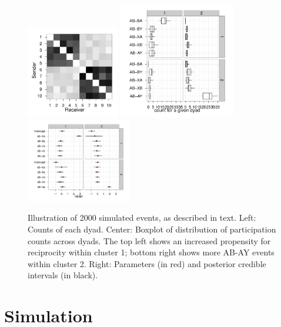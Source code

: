 \documentclass{article}
\begin{document}


\begin{figure}
\center
\includegraphics[width=1.6in]{../figs/synthetic/mat.pdf}
\includegraphics[width=2in]{../figs/synthetic/counts.pdf}
\includegraphics[width=1.8in]{../figs/synthetic/params-estimates.pdf}
\caption{Illustration of 2000 simulated events, as described in text. Left: Counts of each dyad. Center: Boxplot of distribution of participation counts across dyads.  The top left shows an increased propensity for reciprocity within cluster 1; bottom right shows more AB-AY events within cluster 2.  Right: Parameters (in red) and posterior credible intervals (in black).}
\label{fig:syncounts}
\end{figure}

\section{Simulation}
\end{document}
